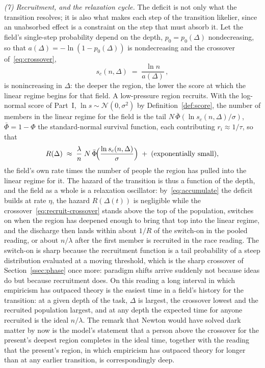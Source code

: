 \documentclass{article}
\begin{document}
\emph{(7) Recruitment, and the relaxation cycle.} The deficit is not only what the transition resolves; it is also what makes each step of the transition likelier, since an unabsorbed effect is a constraint on the step that must absorb it. Let the field's single-step probability depend on the depth, $p_0 = p_0(\Delta)$ nondecreasing, so that $a(\Delta) = -\ln(1 - p_0(\Delta))$ is nondecreasing and the crossover of~\eqref{eq:crossover},
\begin{equation}\label{eq:recruit-crossover}
  s_c(n,\Delta) \;=\; \frac{\ln n}{a(\Delta)}\,,
\end{equation}
is nonincreasing in $\Delta$: the deeper the region, the lower the score at which the linear regime begins for that field. A low-pressure region recruits. With the log-normal score of Part~I, $\ln s \sim \mathcal{N}(0,\sigma^2)$ by Definition~\ref{def:score}, the number of members in the linear regime for the field is the tail $N\,\bar\Phi(\ln s_c(n,\Delta)/\sigma)$, $\bar\Phi = 1 - \Phi$ the standard-normal survival function, each contributing $r_i \approx 1/\tau$, so that
\begin{equation}\label{eq:recruit}
  R(\Delta) \;\approx\; \frac{\lambda}{n}\; N\,\bar\Phi\!\Bigl(\frac{\ln s_c(n,\Delta)}{\sigma}\Bigr) \;+\; (\text{exponentially small}),
\end{equation}
the field's own rate times the number of people the region has pulled into the linear regime for it. The hazard of the transition is thus a function of the depth, and the field as a whole is a relaxation oscillator: by~\eqref{eq:accumulate} the deficit builds at rate $\eta$, the hazard $R(\Delta(t))$ is negligible while the crossover~\eqref{eq:recruit-crossover} stands above the top of the population, switches on when the region has deepened enough to bring that top into the linear regime, and the discharge then lands within about $1/R$ of the switch-on in the pooled reading, or about $n/\lambda$ after the first member is recruited in the race reading. The switch-on is sharp because the recruitment function is a tail probability of a steep distribution evaluated at a moving threshold, which is the sharp crossover of Section~\ref{ssec:phase} once more: paradigm shifts arrive suddenly not because ideas do but because recruitment does. On this reading a long interval in which empiricism has outpaced theory is the easiest time in a field's history for the transition: at a given depth of the task, $\Delta$ is largest, the crossover lowest and the recruited population largest, and at any depth the expected time for anyone recruited is the ideal $n/\lambda$. The remark that Newton would have solved dark matter by now is the model's statement that a person above the crossover for the present's deepest region completes in the ideal time, together with the reading that the present's region, in which empiricism has outpaced theory for longer than at any earlier transition, is correspondingly deep.
\end{document}
